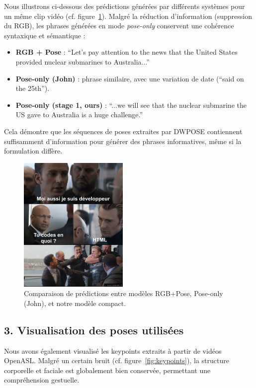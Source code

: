Nous illustrons ci-dessous des prédictions générées par différents systèmes pour un même clip vidéo (cf. figure~\ref{fig:qualitative}). Malgré la réduction d'information (suppression du RGB), les phrases générées en mode \textit{pose-only} conservent une cohérence syntaxique et sémantique :

\begin{itemize}
    \item \textbf{RGB + Pose} : “Let’s pay attention to the news that the United States provided nuclear submarines to Australia...”
    \item \textbf{Pose-only (John)} : phrase similaire, avec une variation de date (“said on the 25th”).
    \item \textbf{Pose-only (stage 1, ours)} : “...we will see that the nuclear submarine the US gave to Australia is a huge challenge.”
\end{itemize}

Cela démontre que les séquences de poses extraites par DWPOSE contiennent suffisamment d’information pour générer des phrases informatives, même si la formulation diffère.

\begin{figure}[h]
    \centering
    \includegraphics[width=0.47\textwidth]{figures/dev_joke.png}
    \caption{Comparaison de prédictions entre modèles RGB+Pose, Pose-only (John), et notre modèle compact.}
    \label{fig:qualitative}
\end{figure}

\subsection*{3. Visualisation des poses utilisées}

Nous avons également visualisé les keypoints extraits à partir de vidéos OpenASL. Malgré un certain bruit (cf. figure~\ref{fig:keypoints}), la structure corporelle et faciale est globalement bien conservée, permettant une compréhension gestuelle.

